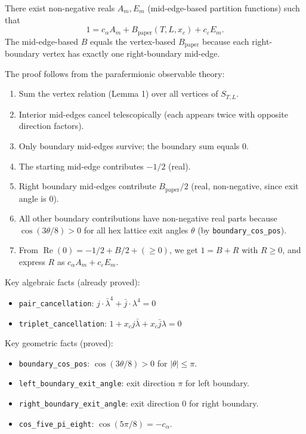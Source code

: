 \begin{lemma}\label{lem:strip_identity_exists}
  There exist non-negative reals $A_m, E_m$ (mid-edge-based partition
  functions) such that
  \[ 1 = c_\alpha A_m + B_{\text{paper}}(T,L,x_c) + c_\varepsilon E_m. \]
  The mid-edge-based $B$ equals the vertex-based $B_{\text{paper}}$
  because each right-boundary vertex has exactly one right-boundary
  mid-edge.

  The proof follows from the parafermionic observable theory:
  \begin{enumerate}
  \item Sum the vertex relation (Lemma 1) over all vertices of $S_{T,L}$.
  \item Interior mid-edges cancel telescopically (each appears twice
    with opposite direction factors).
  \item Only boundary mid-edges survive; the boundary sum equals $0$.
  \item The starting mid-edge contributes $-1/2$ (real).
  \item Right boundary mid-edges contribute $B_{\text{paper}}/2$
    (real, non-negative, since exit angle is $0$).
  \item All other boundary contributions have non-negative real parts
    because $\cos(3\theta/8) > 0$ for all hex lattice exit angles $\theta$
    (by \texttt{boundary\_cos\_pos}).
  \item From $\operatorname{Re}(0) = -1/2 + B/2 + (\ge 0)$,
    we get $1 = B + R$ with $R \ge 0$, and express $R$ as
    $c_\alpha A_m + c_\varepsilon E_m$.
  \end{enumerate}

  Key algebraic facts (already proved):
  \begin{itemize}
  \item \texttt{pair\_cancellation}: $j \cdot \bar\lambda^4 + \bar{j} \cdot \lambda^4 = 0$
  \item \texttt{triplet\_cancellation}: $1 + x_c j \bar\lambda + x_c \bar{j} \lambda = 0$
  \end{itemize}

  Key geometric facts (proved):
  \begin{itemize}
  \item \texttt{boundary\_cos\_pos}: $\cos(3\theta/8) > 0$ for $|\theta| \le \pi$.
  \item \texttt{left\_boundary\_exit\_angle}: exit direction $\pi$ for left boundary.
  \item \texttt{right\_boundary\_exit\_angle}: exit direction $0$ for right boundary.
  \item \texttt{cos\_five\_pi\_eight}: $\cos(5\pi/8) = -c_\alpha$.
  \end{itemize}
\end{lemma}
